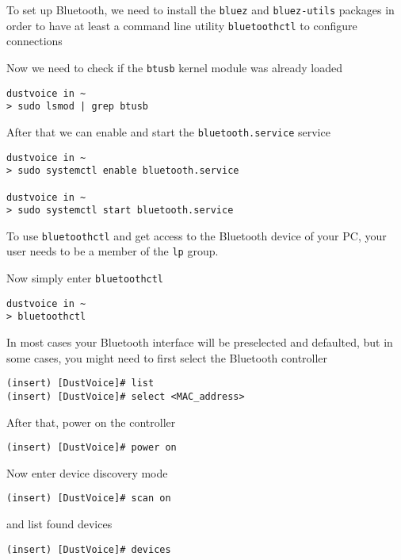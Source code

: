 \documentclass[10pt]{dustdoc}
\begin{document}
To set up Bluetooth, we need to install the \texttt{bluez} and \texttt{bluez-utils} packages in order to have at least a command line utility \texttt{bluetoothctl} to configure connections

Now we need to check if the \texttt{btusb} kernel module was already loaded

\begin{verbatim}
dustvoice in ~
> sudo lsmod | grep btusb
\end{verbatim}


After that we can enable and start the \texttt{bluetooth.service} service

\begin{verbatim}
dustvoice in ~
> sudo systemctl enable bluetooth.service

dustvoice in ~
> sudo systemctl start bluetooth.service
\end{verbatim}


\begin{NOTE}
    To use \texttt{bluetoothctl} and get access to the Bluetooth device of your PC, your user needs to be a member of the \texttt{lp} group.
\end{NOTE}

Now simply enter \texttt{bluetoothctl}

\begin{verbatim}
dustvoice in ~
> bluetoothctl
\end{verbatim}


In most cases your Bluetooth interface will be preselected and defaulted, but in some cases, you might need to first select the Bluetooth controller

\begin{verbatim}
(insert) [DustVoice]# list
(insert) [DustVoice]# select <MAC_address>
\end{verbatim}

After that, power on the controller

\begin{verbatim}
(insert) [DustVoice]# power on
\end{verbatim}

Now enter device discovery mode

\begin{verbatim}
(insert) [DustVoice]# scan on
\end{verbatim}

\noindent
and list found devices

\begin{verbatim}
(insert) [DustVoice]# devices
\end{verbatim}
\end{document}
